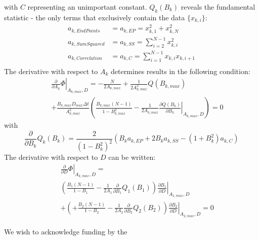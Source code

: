 \documentclass[%
 reprint,
 amsmath,amssymb,
 aps,
]{revtex4-1}
\begin{document}
with $C$ representing an unimportant constant. $Q_{k}(B_{k})$ reveals the fundamental statistic - the only terms that exclusively contain the data $\{x_{k,i}\}$:
\begin{equation}
	\begin{aligned}
		a_{k,EndPoints}&=a_{k,EP}=x_{k,1}^{2}+x_{k,N}^{2}\\
		a_{k,SumSquared}&=a_{k,SS}=\sum\limits_{i=2}^{N-1}x_{k,i}^{2}\\
		a_{k,Correlation}&=a_{k,C}=\sum\limits_{i=1}^{N-1}x_{k,i}x_{k,i+1}\\
	\end{aligned}
\end{equation}
The derivative with respect to $A_{k}$ determines results in the following condition:
\begin{eqnarray}\label{partialsigma}
	&&\left.\frac{\partial}{\partial A_{k}}\Phi\right|_{A_{k,max},D} = -\frac{N}{2A_{k,max}}
	+\frac{1}{2A_{k,max}^{2}}Q(B_{k,max})\\
	&&+\frac{B_{k,max}D_{max}\Delta t}{A_{k,max}^2}\left(\frac{B_{k,max}(N-1)}{1-B_{k,max}^2}
	 -\frac{1}{2A_{k,max}}
	 \left.\frac{\partial Q(B_{k})}{\partial B_{k}}
	 \right|_{A_{k,max},D}\right)=0
\end{eqnarray}
with
\begin{equation}
	\frac{\partial}{\partial B_{k}}Q_{k}(B_{k}) =  \frac{2}{(1-B_{k}^{2})^{2}}\left(B_{k}a_{k,EP}+2B_{k}a_{k,SS}-(1+B_{k}^{2})a_{k,C}\right)
\end{equation}
The derivative with respect to $D$ can be written:
\begin{eqnarray}\label{partiald}
	&&\left.\frac{\partial}{\partial D}\Phi\right|_{A_{k,max},D} =\\
	&&\left(\frac{B_{1}(N-1)}{1-B_{1}}
	-\frac{1}{2A_{1}}\frac{\partial}{\partial B_{1}}Q_{1}(B_{1})\right)\left.\frac{\partial B_{1}}{\partial D}\right|_{A_{1,max},D}\\
	&&+\left(+\frac{B_{2}(N-1)}{1-B_{2}}
	-\frac{1}{2A_{2}}\frac{\partial}{\partial B_{2}}Q_{2}(B_{2})\right)\left.\frac{\partial B_{2}}{\partial D}\right|_{A_{2,max},D}=0
\end{eqnarray}
\begin{acknowledgments}
We wish to acknowledge funding by the 
\end{acknowledgments}

\end{document}
